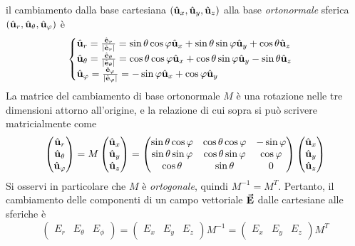il cambiamento dalla base cartesiana $\left(\hat{\mathbf{u}}_x,\hat{\mathbf{u}}_y,\hat{\mathbf{u}}_z\right)$ alla base \textit{ortonormale} sferica $\left(\hat{\mathbf{u}}_r,\hat{\mathbf{u}}_\theta,\hat{\mathbf{u}}_\varphi\right)$ è
\begin{equation}
	\begin{cases}
		\hat{\mathbf{u}}_r=\frac{\hat{\mathbf{e}}_r}{\abs{\hat{\mathbf{e}}_r}}=\sin\theta\cos\varphi\hat{\mathbf{u}}_x+\sin\theta\sin\varphi\hat{\mathbf{u}}_y+\cos\theta\hat{\mathbf{u}}_z\\
		\hat{\mathbf{u}}_\theta=\frac{\hat{\mathbf{e}}_\theta}{\abs{\hat{\mathbf{e}}_\theta}}=\cos\theta\cos\varphi\hat{\mathbf{u}}_x+\cos\theta\sin\varphi\hat{\mathbf{u}}_y-\sin\theta\hat{\mathbf{u}}_z\\
		\hat{\mathbf{u}}_\varphi=\frac{\hat{\mathbf{e}}_\varphi}{\abs{\hat{\mathbf{e}}_\varphi}}=-\sin\varphi\hat{\mathbf{u}}_x+\cos\varphi\hat{\mathbf{u}}_y
	\end{cases}
\end{equation}
La matrice del cambiamento di base ortonormale $M$ è una rotazione nelle tre dimensioni attorno all'origine, e la relazione di cui sopra si può scrivere matricialmente come
\begin{equation}
	\begin{pmatrix}
		\hat{\mathbf{u}}_r\\
		\hat{\mathbf{u}}_\theta\\
		\hat{\mathbf{u}}_\varphi
	\end{pmatrix}=M\begin{pmatrix}
		\hat{\mathbf{u}}_x\\
		\hat{\mathbf{u}}_y\\
		\hat{\mathbf{u}}_z
	\end{pmatrix}=
	\begin{pmatrix}
		\sin\theta\cos\varphi & \cos\theta\cos\varphi & -\sin\varphi\\
		\sin\theta\sin\varphi & \cos\theta\sin\varphi & \cos\varphi\\
		\cos\theta & \sin\theta & 0
	\end{pmatrix}
	\begin{pmatrix}
		\hat{\mathbf{u}}_x\\
		\hat{\mathbf{u}}_y\\
		\hat{\mathbf{u}}_z
	\end{pmatrix}
\end{equation}
Si osservi in particolare che $M$ è \textit{ortogonale}, quindi $M^{-1}=M^{T}$.
Pertanto, il cambiamento delle componenti di un campo vettoriale $\vb*{\va{E}}$ dalle cartesiane alle sferiche è
\begin{equation}
	\begin{pmatrix}
		E_r & E_\theta & E_\phi
	\end{pmatrix}=
	\begin{pmatrix}
		E_x & E_y & E_z
	\end{pmatrix}M^{-1}=
	\begin{pmatrix}
		E_x & E_y & E_z
	\end{pmatrix}M^T
\end{equation}
